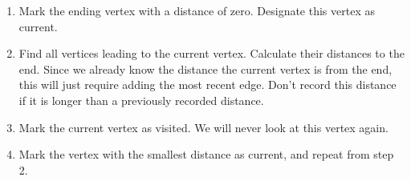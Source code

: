 \begin{enumerate}
\item	Mark the ending vertex with a distance of zero.  Designate this vertex as current.

\dijkstra{$\infty$}{$\infty$}{$\infty$}{$\infty$}{$\infty$}{$\infty$}

\item Find all vertices leading to the current vertex.  Calculate their distances to the end.  Since we already know the distance the current vertex is from the end, this will just require adding the most recent edge.  Don't record this distance if it is longer than a previously recorded distance.
\item	Mark the current vertex as visited.  We will never look at this vertex again.
\item	Mark the vertex with the smallest distance as current, and repeat from step 2.
\end{enumerate}

